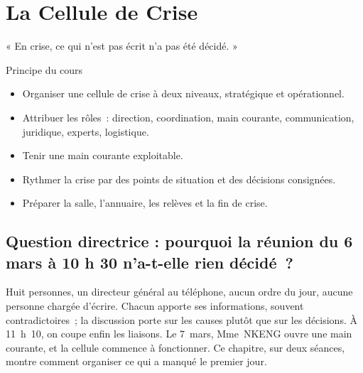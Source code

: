 
\chapter{La Cellule de Crise}
\label{chap:cellule}

\epigraph{%
    « En crise, ce qui n'est pas écrit n'a pas été décidé. »%
}{Principe du cours}


\begin{boxobjectifs}
\begin{itemize}
    \item Organiser une cellule de crise à deux niveaux, stratégique et
          opérationnel.
    \item Attribuer les rôles~: direction, coordination, main courante,
          communication, juridique, experts, logistique.
    \item Tenir une main courante exploitable.
    \item Rythmer la crise par des points de situation et des décisions
          consignées.
    \item Préparer la salle, l'annuaire, les relèves et la fin de crise.
\end{itemize}
\end{boxobjectifs}

\bigskip

\section*{Question directrice : pourquoi la réunion du 6 mars à 10 h 30 n'a-t-elle rien décidé~?}

Huit personnes, un directeur général au téléphone, aucun ordre du jour,
aucune personne chargée d'écrire. Chacun apporte ses informations, souvent
contradictoires~; la discussion porte sur les causes plutôt que sur les
décisions. À 11~h~10, on coupe enfin les liaisons. Le 7~mars, Mme~NKENG
ouvre une main courante, et la cellule commence à fonctionner. Ce chapitre,
sur deux séances, montre comment organiser ce qui a manqué le premier jour.

